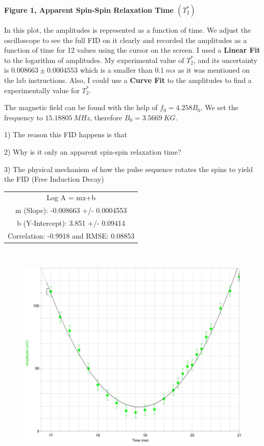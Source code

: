\documentclass[fleqn]{article}
\begin{document}
  \textbf{Figure 1, Apparent Spin-Spin Relaxation Time $(T_2^*)$}

  \vspace{10px}

  In this plot, the amplitudes is represented as a function of time. We adjust the oscilloscope to see 
  the full FID on it clearly and recorded the amplitudes as a function of time for 12 values using the cursor on the 
  screen. I used a \textbf{Linear Fit} to the logarithm of amplitudes. My experimental value of $T_2^*$, and its uncertainty 
  is $0.008663 \pm 0.0004553$ which is a smaller than $0.1 ~ ms$ as it was mentioned on the lab instructions. Also, I could use a 
  \textbf{Curve Fit} to the amplitudes to find a experimentally value for $T_2^*$.

  \vspace{10px}

  The magnetic field can be found with the help of $f_0=4.258 B_0$. We set the frequency to $15.18805 ~ MHz$, 
  therefore $B_0=3.5669 ~ KG$.  

  1) The reason this FID happens is that

  2) Why is it only an apparent spin-spin relaxation time?

  3) The physical mechanism of how the pulse sequence rotates the spins to yield the FID (Free Induction Decay)

  \begin{center}
    \begin{tabular}{ |c| } 
     \hline
     Log A = mx+b  \\ 
     m (Slope): -0.008663 +/- 0.0004553  \\ 
     b (Y-Intercept): 3.851 +/- 0.09414  \\ 
     Correlation: -0.9918 and RMSE: 0.08853 \\
     \hline
    \end{tabular}
  \end{center}
        
  \pagebreak

  \includegraphics[height=9cm, width=14cm]{Fig2.JPG}
\end{document}
